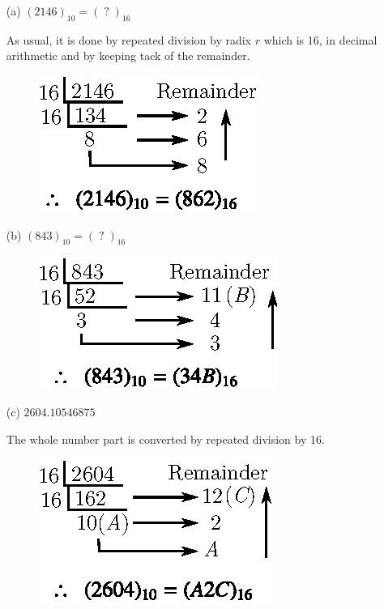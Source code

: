 \begin{solution}
\begin{itemize}
\item[(a)] $(2146)_{10}=(\;?\;)_{16}$

As usual, it is done by repeated division by radix $r$ which is 16, in decimal arithmetic and by keeping tack of the remainder.
\begin{figure}[H]
\centering
\includegraphics[scale=1.1]{chap6/fig17.eps}
\end{figure}

\item[(b)] $(843)_{10}=(\;?\;)_{16}$
\begin{figure}[H]
\centering
\includegraphics[scale=1.1]{chap6/fig18.eps}
\end{figure}

\item[(c)] $2604.10546875$

The whole number part is converted by repeated division by 16.
\begin{figure}[H]
\centering
\includegraphics[scale=1.1]{chap6/fig19.eps}
\end{figure}


\end{itemize}
\end{solution}
